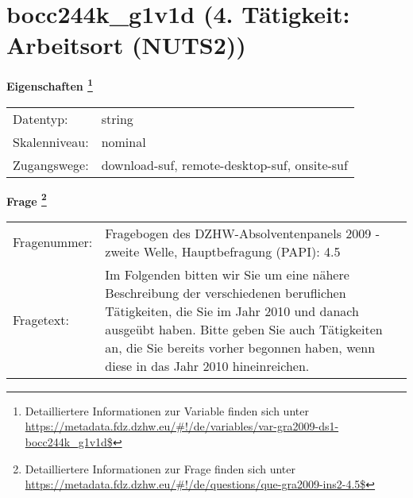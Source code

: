 
    \setcounter{footnote}{0}

    \vspace*{-1.8cm}
	\section{bocc244k\_g1v1d (4. Tätigkeit: Arbeitsort (NUTS2))}
	\label{section:bocc244k_g1v1d}



    \vspace*{0.5cm}
    \noindent\textbf{Eigenschaften
	\footnote{Detailliertere Informationen zur Variable finden sich unter
		\url{https://metadata.fdz.dzhw.eu/\#!/de/variables/var-gra2009-ds1-bocc244k_g1v1d$}}}\\
	\begin{tabularx}{\hsize}{@{}lX}
	Datentyp: & string \\
	Skalenniveau: & nominal \\
	Zugangswege: &
	  download-suf, 
	  remote-desktop-suf, 
	  onsite-suf
 \\
    \end{tabularx}



				\vspace*{0.5cm}
                \noindent\textbf{Frage
	                \footnote{Detailliertere Informationen zur Frage finden sich unter
		              \url{https://metadata.fdz.dzhw.eu/\#!/de/questions/que-gra2009-ins2-4.5$}}}\\
				\begin{tabularx}{\hsize}{@{}lX}
					Fragenummer: &
					  Fragebogen des DZHW-Absolventenpanels 2009 - zweite Welle, Hauptbefragung (PAPI):
					  4.5
 \\
					Fragetext: & Im Folgenden bitten wir Sie um eine nähere Beschreibung der verschiedenen beruflichen Tätigkeiten, die Sie im Jahr 2010 und danach ausgeübt haben. Bitte geben Sie auch Tätigkeiten an, die Sie bereits vorher begonnen haben, wenn diese in das Jahr 2010 hineinreichen. \\
				\end{tabularx}





